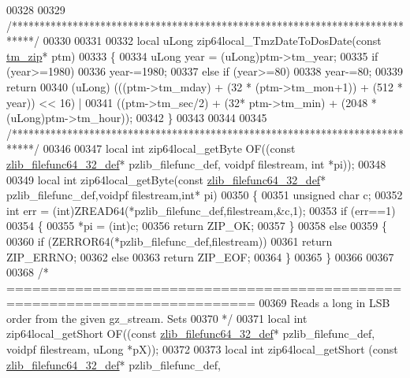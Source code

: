 \begin{DoxyCode}
00328 
00329 \textcolor{comment}{/****************************************************************************/}
00330 
00331 
00332 local uLong zip64local\_TmzDateToDosDate(\textcolor{keyword}{const} \hyperlink{structtm__zip__s}{tm\_zip}* ptm)
00333 \{
00334     uLong year = (uLong)ptm->tm\_year;
00335     if (year>=1980)
00336         year-=1980;
00337     \textcolor{keywordflow}{else} \textcolor{keywordflow}{if} (year>=80)
00338         year-=80;
00339     \textcolor{keywordflow}{return}
00340       (uLong) (((ptm->tm\_mday) + (32 * (ptm->tm\_mon+1)) + (512 * year)) << 16) |
00341         ((ptm->tm\_sec/2) + (32* ptm->tm\_min) + (2048 * (uLong)ptm->tm\_hour));
00342 \}
00343 
00344 
00345 \textcolor{comment}{/****************************************************************************/}
00346 
00347 local \textcolor{keywordtype}{int} zip64local\_getByte OF((\textcolor{keyword}{const} \hyperlink{structzlib__filefunc64__32__def__s}{zlib\_filefunc64\_32\_def}* pzlib\_filefunc\_def, 
      voidpf filestream, \textcolor{keywordtype}{int} *pi));
00348 
00349 local \textcolor{keywordtype}{int} zip64local\_getByte(\textcolor{keyword}{const} \hyperlink{structzlib__filefunc64__32__def__s}{zlib\_filefunc64\_32\_def}* pzlib\_filefunc\_def,voidpf 
      filestream,\textcolor{keywordtype}{int}* pi)
00350 \{
00351     \textcolor{keywordtype}{unsigned} \textcolor{keywordtype}{char} c;
00352     \textcolor{keywordtype}{int} err = (int)ZREAD64(*pzlib\_filefunc\_def,filestream,&c,1);
00353     \textcolor{keywordflow}{if} (err==1)
00354     \{
00355         *pi = (int)c;
00356         \textcolor{keywordflow}{return} ZIP\_OK;
00357     \}
00358     \textcolor{keywordflow}{else}
00359     \{
00360         \textcolor{keywordflow}{if} (ZERROR64(*pzlib\_filefunc\_def,filestream))
00361             \textcolor{keywordflow}{return} ZIP\_ERRNO;
00362         \textcolor{keywordflow}{else}
00363             \textcolor{keywordflow}{return} ZIP\_EOF;
00364     \}
00365 \}
00366 
00367 
00368 \textcolor{comment}{/* ===========================================================================}
00369 \textcolor{comment}{   Reads a long in LSB order from the given gz\_stream. Sets}
00370 \textcolor{comment}{*/}
00371 local \textcolor{keywordtype}{int} zip64local\_getShort OF((\textcolor{keyword}{const} \hyperlink{structzlib__filefunc64__32__def__s}{zlib\_filefunc64\_32\_def}* pzlib\_filefunc\_def, 
      voidpf filestream, uLong *pX));
00372 
00373 local \textcolor{keywordtype}{int} zip64local\_getShort (\textcolor{keyword}{const} \hyperlink{structzlib__filefunc64__32__def__s}{zlib\_filefunc64\_32\_def}* pzlib\_filefunc\_def, 

\end{DoxyCode}
